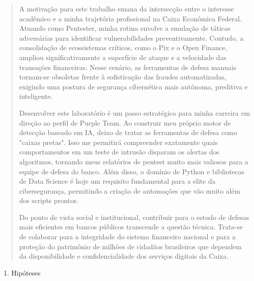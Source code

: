 \documentclass[]{article}
\begin{document}
\begin{quote}
A motivação para este trabalho emana da intersecção entre o interesse
acadêmico e a minha trajetória profissional na Caixa Econômica Federal.
Atuando como Pentester, minha rotina envolve a emulação de táticas
adversárias para identificar vulnerabilidades preventivamente. Contudo,
a consolidação de ecossistemas críticos, como o Pix e o Open Finance,
ampliou significativamente a superfície de ataque e a velocidade das
transações financeiras. Nesse cenário, as ferramentas de defesa manuais
tornam-se obsoletas frente à sofisticação das fraudes automatizadas,
exigindo uma postura de segurança cibernética mais autônoma, preditiva e
inteligente.

Desenvolver este laboratório é um passo estratégico para minha carreira
em direção ao perfil de Purple Team. Ao construir meu próprio motor de
detecção baseado em IA, deixo de tratar as ferramentas de defesa como
"caixas pretas". Isso me permitirá compreender exatamente quais
comportamentos em um teste de intrusão disparam os alertas dos
algoritmos, tornando meus relatórios de pentest muito mais valiosos para
a equipe de defesa do banco. Além disso, o domínio de Python e
bibliotecas de Data Science é hoje um requisito fundamental para a elite
da cibersegurança, permitindo a criação de automações que vão muito além
dos scripts prontos.

Do ponto de vista social e institucional, contribuir para o estudo de
defesas mais eficientes em bancos públicos transcende a questão técnica.
Trata-se de colaborar para a integridade do sistema financeiro nacional
e para a proteção do patrimônio de milhões de cidadãos brasileiros que
dependem da disponibilidade e confidencialidade dos serviços digitais da
Caixa.
\end{quote}

\begin{enumerate}
\def\labelenumi{\arabic{enumi}.}
\setcounter{enumi}{2}
\item
  Hipóteses
\end{enumerate}
\end{document}

